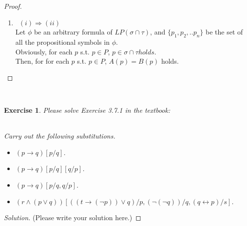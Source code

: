 \documentclass[12pt,a4paper]{article}
\theoremstyle{plain}
\newtheorem{exercise}{Exercise}
\begin{document}
\begin{proof}\
    \begin{enumerate}
        \item\ 
            $(i) \Rightarrow (ii)$\\
            Let $\phi$ be an arbitrary formula of $LP(\sigma \cap \tau)$, and $\{p_1,p_2,..p_n\}$ be the set of all the propositional symbols in $\phi$.\\
            Obviously, for each $p$ s.t. $p \in P$, $p \in \sigma \cap \tau holds$.\\
            Then, for for each $p$ s.t. $p \in P$, $A(p) = B(p)$ holds.\\
            
    \end{enumerate}
\end{proof}

\ \\
\begin{exercise}
Please solve Exercise 3.7.1 in the textbook:

\ \\
Carry out the following substitutions.
%
\begin{itemize}

\item[(a)] $( p \rightarrow q)[p/q]$.

\item[(b)] $( p \rightarrow q)[p/q][q/p]$.

\item[(c)] $(p \rightarrow q)[p/q, q/p]$.

\item[(d)] $( r \wedge (p \vee q))[((t \rightarrow ( \neg p)) \vee q)/p, ( \neg ( \neg q))/q, (q \leftrightarrow p)/s]$.

\end{itemize}
\end{exercise}

\begin{proof}[Solution]
(Please write your solution here.)
\end{proof}
\end{document}
